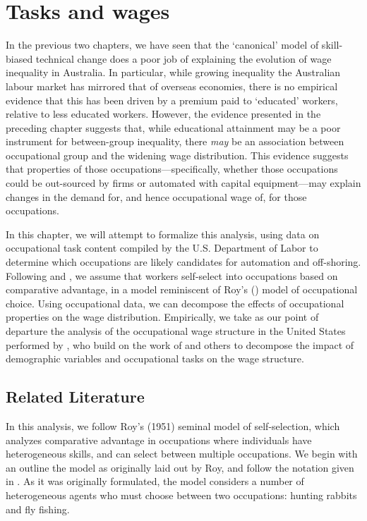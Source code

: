\chapter{Tasks and wages}

In the previous two chapters, we have seen that the `canonical' model of skill-biased technical change does a poor job of explaining the evolution of wage inequality in Australia. In particular, while growing inequality the Australian labour market has mirrored that of overseas economies, there is no empirical evidence that this has been driven by a premium paid to `educated' workers, relative to less educated workers. However, the evidence presented in the preceding chapter suggests that, while educational attainment may be a poor instrument for between-group inequality, there {\em may} be an association between occupational group and the widening wage distribution. This evidence suggests that properties of those occupations---specifically, whether those occupations could be out-sourced by firms or automated with capital equipment---may explain changes in the demand for, and hence occupational wage of, for those occupations.

In this chapter, we will attempt to formalize this analysis, using data on occupational task content compiled by the U.S. Department of Labor to determine which occupations are likely candidates for automation and off-shoring. Following \citet{Autor2012} and \citet{Fortin2011}, we assume that workers self-select into occupations based on comparative advantage, in a model reminiscent of Roy's (\citeyear{Roy1951}) model of occupational choice. Using occupational data, we can decompose the effects of occupational properties on the wage distribution. Empirically, we take as our point of departure the analysis of the occupational wage structure in the United States performed by \citet{Fortin2011}, who build on the work of \citet{Oaxaca1973} and others to decompose the impact of demographic variables and occupational tasks on the wage structure.

\section{Related Literature}

In this analysis, we follow Roy's (1951) seminal model of self-selection, which analyzes comparative advantage in occupations where individuals have heterogeneous skills, and can select between multiple occupations. We begin with an outline the model as originally laid out by Roy, and follow the notation given in \citet{Heckman2008}. As it was originally formulated, the model considers a number of heterogeneous agents who must choose between two occupations: hunting rabbits and fly fishing. 

